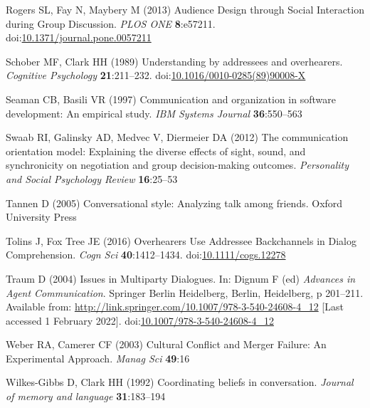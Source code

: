 \documentclass[
  english,
  a4paper,
]{article}
\newlength{\cslhangindent}
\newlength{\cslentryspacingunit} %
\newenvironment{CSLReferences}[2] %
 {%
  \setlength{\parindent}{0pt}
  \ifodd #1
  \let\oldpar\par
  \def\par{\hangindent=\cslhangindent\oldpar}
  \fi
  \setlength{\parskip}{#2\cslentryspacingunit}
 }%
 {}
\begin{document}
\begin{CSLReferences}{1}{0}
\leavevmode{}%
Rogers SL, Fay N, Maybery M (2013) Audience {Design} through {Social Interaction} during {Group Discussion}. \emph{PLOS ONE} \textbf{8}:e57211. doi:\href{https://doi.org/10.1371/journal.pone.0057211}{10.1371/journal.pone.0057211}

\leavevmode{}%
Schober MF, Clark HH (1989) Understanding by addressees and overhearers. \emph{Cognitive Psychology} \textbf{21}:211--232. doi:\href{https://doi.org/10.1016/0010-0285(89)90008-X}{10.1016/0010-0285(89)90008-X}

\leavevmode{}%
Seaman CB, Basili VR (1997) Communication and organization in software development: An empirical study. \emph{IBM Systems Journal} \textbf{36}:550--563

\leavevmode{}%
Swaab RI, Galinsky AD, Medvec V, Diermeier DA (2012) The communication orientation model: Explaining the diverse effects of sight, sound, and synchronicity on negotiation and group decision-making outcomes. \emph{Personality and Social Psychology Review} \textbf{16}:25--53

\leavevmode{}%
Tannen D (2005) Conversational style: Analyzing talk among friends. Oxford University Press

\leavevmode{}%
Tolins J, Fox Tree JE (2016) Overhearers {Use Addressee Backchannels} in {Dialog Comprehension}. \emph{Cogn Sci} \textbf{40}:1412--1434. doi:\href{https://doi.org/10.1111/cogs.12278}{10.1111/cogs.12278}

\leavevmode{}%
Traum D (2004) Issues in {Multiparty Dialogues}. In: Dignum F (ed) \emph{Advances in {Agent Communication}}. {Springer Berlin Heidelberg}, {Berlin, Heidelberg}, p 201--211. Available from: \url{http://link.springer.com/10.1007/978-3-540-24608-4_12} {[}Last accessed 1 February 2022{]}. doi:\href{https://doi.org/10.1007/978-3-540-24608-4_12}{10.1007/978-3-540-24608-4\_12}

\leavevmode{}%
Weber RA, Camerer CF (2003) Cultural {Conﬂict} and {Merger Failure}: {An Experimental Approach}. \emph{Manag Sci} \textbf{49}:16

\leavevmode{}%
Wilkes-Gibbs D, Clark HH (1992) Coordinating beliefs in conversation. \emph{Journal of memory and language} \textbf{31}:183--194


\end{CSLReferences}
\end{document}
